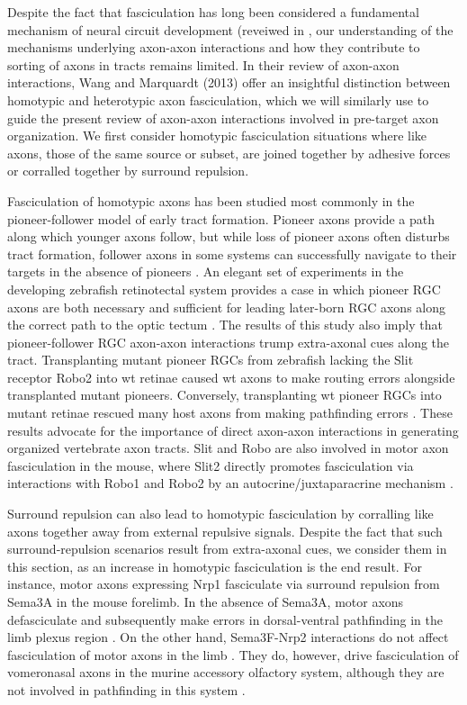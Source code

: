 Despite the fact that fasciculation has long been considered a fundamental mechanism of neural circuit development (reveiwed in \cite{raper2010cellular,wang2013axons}, our understanding of the mechanisms underlying axon-axon interactions and how they contribute to sorting of axons in tracts remains limited.
In their review of axon-axon interactions, Wang and Marquardt (2013) offer an insightful distinction between homotypic and heterotypic axon fasciculation, which we will similarly use to guide the present review of axon-axon interactions involved in pre-target axon organization. 
We first consider homotypic fasciculation situations where like axons, those of the same source or subset, are joined together by adhesive forces or corralled together by surround repulsion.

Fasciculation of homotypic axons has been studied most commonly in the pioneer-follower model of early tract formation. 
Pioneer axons provide a path along which younger axons follow, but while loss of pioneer axons often disturbs tract formation, follower axons in some systems can successfully navigate to their targets in the absence of pioneers \cite{raper2010cellular}.
An elegant set of experiments in the developing zebrafish retinotectal system provides a case in which pioneer RGC axons are both necessary and sufficient for leading later-born RGC axons along the correct path to the optic tectum \cite{pittman2008pathfinding}.
The results of this study also imply that pioneer-follower RGC axon-axon interactions trump extra-axonal cues along the tract.
Transplanting mutant pioneer RGCs from zebrafish lacking the Slit receptor Robo2 into wt retinae caused wt axons to make routing errors alongside transplanted mutant pioneers.
Conversely, transplanting wt pioneer RGCs into mutant retinae rescued many host axons from making pathfinding errors \cite{pittman2008pathfinding}.
These results advocate for the importance of direct axon-axon interactions in generating organized vertebrate axon tracts.
Slit and Robo are also involved in motor axon fasciculation in the mouse, where Slit2 directly promotes fasciculation via interactions with Robo1 and Robo2 by an autocrine/juxtaparacrine mechanism \cite{jaworski2012autocrine}.

Surround repulsion can also lead to homotypic fasciculation by corralling like axons together away from external repulsive signals.
Despite the fact that such surround-repulsion scenarios result from extra-axonal cues, we consider them in this section, as an increase in homotypic fasciculation is the end result.
For instance, motor axons expressing Nrp1 fasciculate via surround repulsion from Sema3A in the mouse forelimb.
In the absence of Sema3A, motor axons defasciculate and subsequently make errors in dorsal-ventral pathfinding in the limb plexus region \cite{huber2005distinct}.
On the other hand, Sema3F-Nrp2 interactions do not affect fasciculation of motor axons in the limb \cite{huber2005distinct}.
They do, however, drive fasciculation of vomeronasal axons in the murine accessory olfactory system, although they are not involved in pathfinding in this system \cite{cloutier2002neuropilin}.

